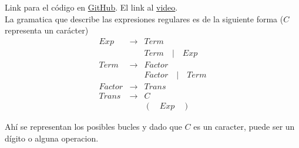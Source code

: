 Link para el código en \href{https://github.com/DSarceno/Semestre7/tree/main/ProgramacionMatematica2/Final}{GitHub}. El link al \href{https://youtu.be/9M0k9_siBo0}{video}. \\

La gramatica que describe las expresiones regulares es de la siguiente forma ($C$ representa un carácter)
$$
	\left.\begin{array}{ccc}
		Exp & \to & Term \\
		& & Term \quad | \quad Exp \\
		Term & \to & Factor \\
		& & Factor \quad | \quad Term \\
		Factor & \to & Trans \\
		Trans & \to & C \\
		& & ( \quad Exp \quad )
		
		
	\end{array}\right.
$$

Ahí se representan los posibles bucles y dado que $C$ es un caracter, puede ser un dígito o alguna operacion.